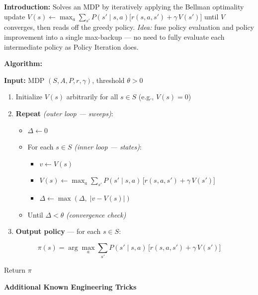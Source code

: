 \documentclass[11pt]{article}
\providecommand{\tightlist}{%
      \setlength{\itemsep}{0pt}\setlength{\parskip}{0pt}}
\begin{document}
    \label{intro-1-1}

    \textbf{Introduction:} Solves an MDP by iteratively applying the Bellman
optimality update
\(V(s) \leftarrow \max_a \sum_{s'} P(s'\mid s,a)\bigl[r(s,a,s') + \gamma\, V(s')\bigr]\)
until \(V\) converges, then reads off the greedy policy. \emph{Idea:}
fuse policy evaluation and policy improvement into a single max-backup
--- no need to fully evaluate each intermediate policy as Policy
Iteration does.

    \textbf{Algorithm:}

\textbf{Input:} MDP \((S, A, P, r, \gamma)\), threshold \(\theta > 0\)

\begin{enumerate}
\def\labelenumi{\arabic{enumi}.}
\item
  Initialize \(V(s)\) arbitrarily for all \(s \in S\) (e.g.,
  \(V(s) = 0\))
\item
  \textbf{Repeat} \emph{(outer loop --- sweeps)}:

  \begin{itemize}
  \tightlist
  \item
    \(\Delta \leftarrow 0\)
  \item
    For each \(s \in S\) \emph{(inner loop --- states)}:

    \begin{itemize}
    \tightlist
    \item
      \(v \leftarrow V(s)\)
    \item
      \(\displaystyle V(s) \leftarrow \max_a \sum_{s'} P(s' \mid s,a)\,\bigl[r(s,a,s') + \gamma\, V(s')\bigr]\)
    \item
      \(\Delta \leftarrow \max(\Delta,\; |v - V(s)|)\)
    \end{itemize}
  \item
    Until \(\Delta < \theta\) \emph{(convergence check)}
  \end{itemize}
\item
  \textbf{Output policy} --- for each \(s \in S\):
\end{enumerate}

\[\pi(s) = \arg\max_a \sum_{s'} P(s' \mid s,a)\,\bigl[r(s,a,s') + \gamma\, V(s')\bigr]\]

Return \(\pi\)

    \label{tricks-1-1}

    \textbf{Additional Known Engineering Tricks}
\end{document}

